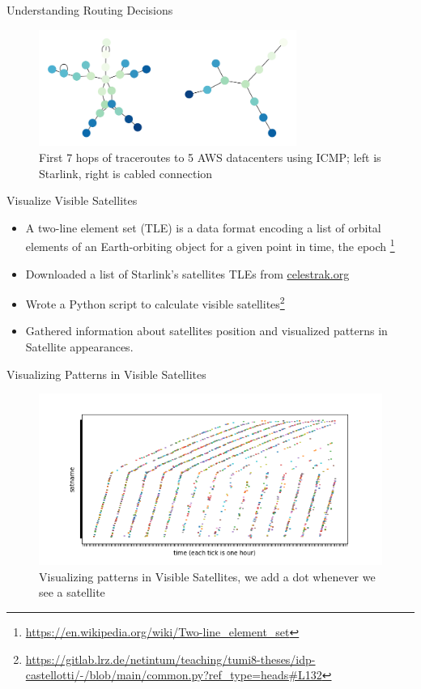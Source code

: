 \documentclass[NET,english,beameralt]{tumbeamer}
\begin{document}
\begin{frame}{Understanding Routing Decisions}
	\begin{figure}
    	\includegraphics[width=0.75\textwidth]{pics/aws_7_icmp.png}
    	\caption{First 7 hops of traceroutes to 5 AWS datacenters using ICMP; left is Starlink, right is cabled connection}
	\end{figure}
\end{frame}

\begin{frame}{Visualize Visible Satellites}
	\begin{itemize}
        \item A two-line element set (TLE) is a data format encoding a list of orbital elements of an Earth-orbiting
        object for a given point in time, the epoch \footnote{\url{https://en.wikipedia.org/wiki/Two-line_element_set}}
    	\item Downloaded a list of Starlink's satellites TLEs from \href{celestrak.org}{celestrak.org}
		\item Wrote a Python script to calculate visible
		satellites\footnote{\url{https://gitlab.lrz.de/netintum/teaching/tumi8-theses/idp-castellotti/-/blob/main/common.py?ref_type=heads\#L132}}
        \item Gathered information about satellites position and visualized patterns in Satellite appearances.
    \end{itemize}
\end{frame}

\begin{frame}{Visualizing Patterns in Visible Satellites}
    \begin{figure}
        \includegraphics[width=1\textwidth]{pics/patterns-in-satellite-appearances.png}
        \caption{Visualizing patterns in Visible Satellites, we add a dot whenever we see a satellite}
    \end{figure}
\end{frame}
\end{document}
